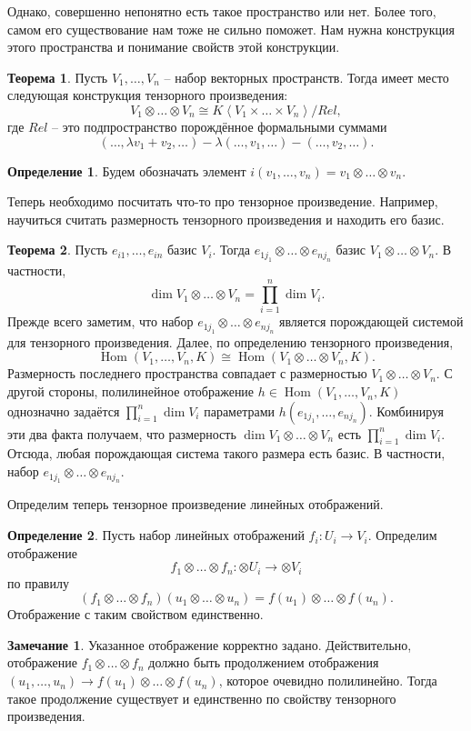 \documentclass[10pt,a4paper,oneside]{book}
\theoremstyle{definition}
\newtheorem*{rem}{Замечание}
\newtheorem*{defn}{{\color{yellow!20!red} Определение}}
\newtheorem{thm}{{\color{red!40!black} Теорема}}
\newcommand{\Hom}{\operatorname{Hom}}
\def\lan{\left\langle }
\def\ran{\right\rangle}
\def\thrm{\begin{thm}}
\def\ethrm{\end{thm}}
\def\dfn{\begin{defn}}
\def\edfn{\end{defn}}
\def\rm{\begin{rem}}
\def\erm{\end{rem}}
\begin{document}
Однако, совершенно непонятно есть такое пространство или нет. Более того, самом его существование нам тоже не сильно поможет. Нам нужна конструкция этого пространства и понимание свойств этой конструкции.

\thrm Пусть $V_1,\dots,V_n$ -- набор векторных пространств. Тогда имеет место следующая конструкция тензорного произведения:
$$V_1 \otimes \dots \otimes V_n \cong K\lan V_1 \times \dots \times V_n \ran / Rel,$$
где $Rel$ -- это подпространство порождённое формальными суммами
$$(\dots, \lambda v_1+v_2, \dots) - \lambda (\dots,v_1, \dots) - (\dots, v_2, \dots).$$ 
\ethrm

\dfn Будем обозначать элемент $i(v_1,\dots,v_n)=v_1\otimes \dots \otimes v_n$. 
\edfn

Теперь необходимо посчитать что-то про тензорное произведение. Например, научиться считать размерность тензорного произведения и находить его базис.
\thrm Пусть $e_{i1},\dots,e_{in}$ базис $V_i$. Тогда $e_{1j_1}\otimes \dots \otimes e_{nj_n}$ базис $V_1 \otimes \dots \otimes V_n$. В частности, 
$$\dim V_1 \otimes \dots \otimes V_n= \prod_{i=1}^n \dim V_i.$$ 
\proof Прежде всего заметим, что набор $e_{1j_1}\otimes \dots \otimes e_{nj_n}$ является порождающей системой для тензорного произведения. Далее, по определению тензорного произведения,
$$\Hom(V_1,\dots,V_n, K) \cong \Hom(V_1\otimes \dots \otimes V_n,K).$$
Размерность последнего пространства совпадает с размерностью $V_1\otimes \dots \otimes V_n$. С другой стороны, полилинейное отображение $h \in \Hom(V_1,\dots,V_n, K)$ однозначно задаётся $\prod_{i=1}^n \dim V_i$  параметрами $h(e_{1j_1}, \dots,e_{nj_n})$. Комбинируя эти два факта получаем, что размерность $\dim V_1 \otimes \dots \otimes V_n$ есть $\prod_{i=1}^n \dim V_i$. Отсюда, любая порождающая система такого размера есть базис. В частности, набор $e_{1j_1}\otimes \dots \otimes e_{nj_n}$.
\endproof
\ethrm



Определим теперь тензорное произведение линейных отображений.

\dfn Пусть набор линейных отображений $f_i \colon U_i \to V_i$. Определим отображение $$f_1\otimes \dots \otimes f_n \colon \otimes U_i \to \otimes V_i$$ по  правилу $$(f_1\otimes \dots \otimes f_n) (u_1\otimes \dots \otimes u_n) = f(u_1)\otimes \dots \otimes f(u_n).$$
Отображение с таким свойством единственно.
\edfn

\rm Указанное отображение корректно задано. Действительно,  отображение $f_1\otimes \dots \otimes f_n$ должно быть продолжением отображения $(u_1,\dots,u_n) \to f(u_1) \otimes \dots \otimes f(u_n)$, которое очевидно полилинейно. Тогда такое продолжение существует и единственно по свойству тензорного произведения. 
\erm
\end{document}
